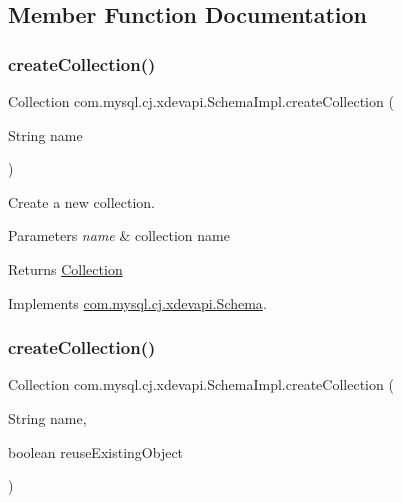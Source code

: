 \subsection{Member Function Documentation}
\mbox{\label{classcom_1_1mysql_1_1cj_1_1xdevapi_1_1_schema_impl_a36cc97bce57ffb6124bc7f25ee6ed60e}} 
\subsubsection{\texorpdfstring{create\+Collection()}{createCollection()}\hspace{0.1cm}{\footnotesize\ttfamily [1/2]}}
{\footnotesize\ttfamily Collection com.\+mysql.\+cj.\+xdevapi.\+Schema\+Impl.\+create\+Collection (\begin{DoxyParamCaption}\item[{String}]{name }\end{DoxyParamCaption})}

Create a new collection.


\begin{DoxyParams}{Parameters}
{\em name} & collection name \\
\hline
\end{DoxyParams}
\begin{DoxyReturn}{Returns}
\mbox{\hyperlink{interfacecom_1_1mysql_1_1cj_1_1xdevapi_1_1_collection}{Collection}} 
\end{DoxyReturn}


Implements \mbox{\hyperlink{interfacecom_1_1mysql_1_1cj_1_1xdevapi_1_1_schema_a40a19a9c1a57c92b4197c545d21f11ea}{com.\+mysql.\+cj.\+xdevapi.\+Schema}}.

\mbox{\label{classcom_1_1mysql_1_1cj_1_1xdevapi_1_1_schema_impl_a723a878ef263bfeec2efcf434849da84}} 
\subsubsection{\texorpdfstring{create\+Collection()}{createCollection()}\hspace{0.1cm}{\footnotesize\ttfamily [2/2]}}
{\footnotesize\ttfamily Collection com.\+mysql.\+cj.\+xdevapi.\+Schema\+Impl.\+create\+Collection (\begin{DoxyParamCaption}\item[{String}]{name,  }\item[{boolean}]{reuse\+Existing\+Object }\end{DoxyParamCaption})}

